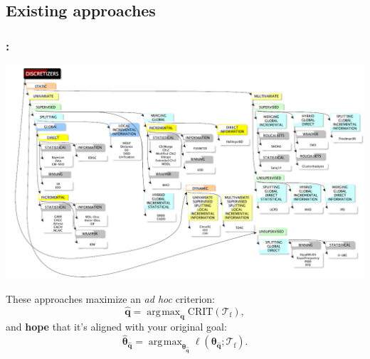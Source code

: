 \documentclass[english,xcolor={rgb,dvipsnames,table,usenames}]{beamer}
\DeclareMathOperator*{\argmax}{\arg\!\max}
\newcommand\q{{\bm{q}}}
\newcommand{\f}{\text{f}}
\begin{document}
\subsection{Existing approaches}
\begin{frame}
\frametitle{\secname: \subsecname}

\vspace*{-0.1cm}
\begin{center}
\includegraphics[scale=0.25]{figures/taxonomy.PNG}
\end{center}

These approaches maximize an \textit{ad hoc} criterion:
\vspace*{-0.1cm}
\[ \hat{\q} = \argmax_{\q} \text{CRIT}(\mathcal{T}_\f), \]
\vspace*{-0.1cm}
and {\bf hope} that it's aligned with your original goal:
\vspace*{-0.1cm}
\[ \hat{\bm{\theta}}_{\hat{\q}} = \argmax_{\bm{\theta}_{\hat{\q}}} \ell(\bm{\theta}_{\hat{\q}} ; \mathcal{T}_\f). \]

\end{frame}
\end{document}
